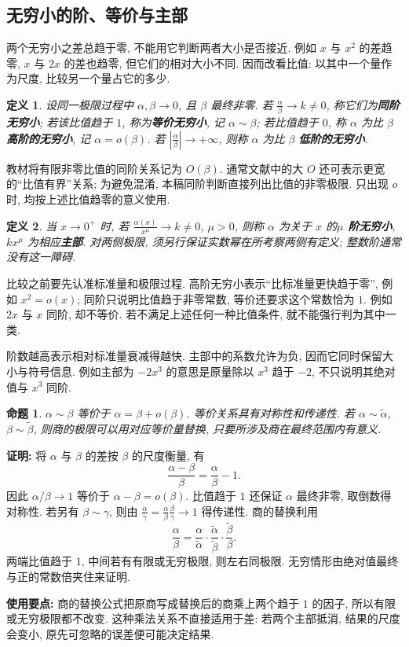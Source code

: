 \documentclass[UTF8,openany]{ctexbook}
\theoremstyle{chinesetextbook}
\newtheorem{definition}{定义}[section]
\newtheorem{proposition}{命题}[section]
\newenvironment{cnproof}{\par\indent\textbf{证明:} \ignorespaces}{\par}
\begin{document}
\subsection{无穷小的阶、等价与主部}
两个无穷小之差总趋于零, 不能用它判断两者大小是否接近. 例如 $x$ 与 $x^2$ 的差趋零, $x$ 与 $2x$ 的差也趋零, 但它们的相对大小不同. 因而改看比值: 以其中一个量作为尺度, 比较另一个量占它的多少.
\begin{definition}
设同一极限过程中 $\alpha,\beta\to0$, 且 $\beta$ 最终非零. 若 $\displaystyle \frac\alpha\beta\to k\ne0$, 称它们为\textbf{同阶无穷小}; 若该比值趋于 $1$, 称为\textbf{等价无穷小}, 记 $\alpha\sim\beta$; 若比值趋于 $0$, 称 $\alpha$ 为比 $\beta$ \textbf{高阶的无穷小}, 记 $\alpha=o(\beta)$. 若 $\displaystyle\left|\frac\alpha\beta\right|\to+\infty$, 则称 $\alpha$ 为比 $\beta$ \textbf{低阶的无穷小}.
\end{definition}
教材将有限非零比值的同阶关系记为 $O(\beta)$. 通常文献中的大 $O$ 还可表示更宽的“比值有界”关系; 为避免混淆, 本稿同阶判断直接列出比值的非零极限. 只出现 $o$ 时, 均按上述比值趋零的意义使用.
\begin{definition}
当 $x\to0^+$ 时, 若 $\displaystyle \frac{\alpha(x)}{x^\mu}\to k\ne0$, $\mu>0$, 则称 $\alpha$ 为关于 $x$ 的\textbf{$\mu$ 阶无穷小}, $kx^\mu$ 为相应\textbf{主部}. 对两侧极限, 须另行保证实数幂在所考察两侧有定义; 整数阶通常没有这一障碍.
\end{definition}
比较之前要先认准标准量和极限过程. 高阶无穷小表示“比标准量更快趋于零”, 例如 $x^2=o(x)$; 同阶只说明比值趋于非零常数, 等价还要求这个常数恰为 $1$. 例如 $2x$ 与 $x$ 同阶, 却不等价. 若不满足上述任何一种比值条件, 就不能强行判为其中一类.

阶数越高表示相对标准量衰减得越快. 主部中的系数允许为负, 因而它同时保留大小与符号信息. 例如主部为 $-2x^3$ 的意思是原量除以 $x^3$ 趋于 $-2$, 不只说明其绝对值与 $x^3$ 同阶.
\begin{proposition}
$\alpha\sim\beta$ 等价于 $\alpha=\beta+o(\beta)$. 等价关系具有对称性和传递性. 若 $\alpha\sim\widetilde\alpha$, $\beta\sim\widetilde\beta$, 则商的极限可以用对应等价量替换, 只要所涉及商在最终范围内有意义.
\end{proposition}
\begin{cnproof}
将 $\alpha$ 与 $\beta$ 的差按 $\beta$ 的尺度衡量, 有
\[
\frac{\alpha-\beta}{\beta}=\frac\alpha\beta-1.
\]
因此 $\alpha/\beta\to1$ 等价于 $\alpha-\beta=o(\beta)$. 比值趋于 $1$ 还保证 $\alpha$ 最终非零, 取倒数得对称性. 若另有 $\beta\sim\gamma$, 则由 $\displaystyle\frac\alpha\gamma=\frac\alpha\beta\frac\beta\gamma\to1$ 得传递性. 商的替换利用
\[
\frac\alpha\beta
=\frac\alpha{\widetilde\alpha}\cdot
\frac{\widetilde\alpha}{\widetilde\beta}\cdot
\frac{\widetilde\beta}{\beta}.
\]
两端比值趋于 $1$, 中间若有有限或无穷极限, 则左右同极限. 无穷情形由绝对值最终与正的常数倍夹住来证明.
\end{cnproof}
\par\indent\textbf{使用要点:} 商的替换公式把原商写成替换后的商乘上两个趋于 $1$ 的因子, 所以有限或无穷极限都不改变. 这种乘法关系不直接适用于差: 若两个主部抵消, 结果的尺度会变小, 原先可忽略的误差便可能决定结果.
\end{document}
